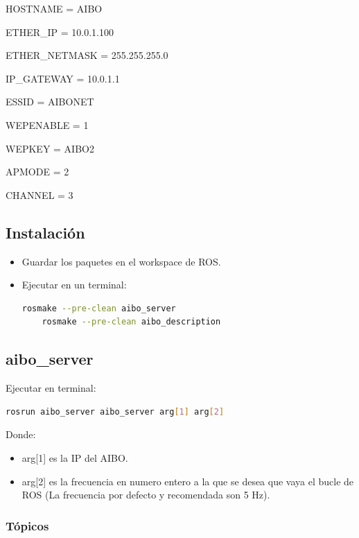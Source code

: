 \documentclass[12pt,a4paper,final,twoside]{book}
\begin{document}
\begin{itemize}
HOSTNAME = AIBO

ETHER{\_}IP = 10.0.1.100

ETHER{\_}NETMASK = 255.255.255.0

IP{\_}GATEWAY = 10.0.1.1

ESSID = AIBONET

WEPENABLE = 1

WEPKEY = AIBO2

APMODE = 2

CHANNEL = 3 
\end{itemize}

\subsection{Instalación}
\begin{itemize}
\item Guardar los paquetes en el workspace de ROS.
\item Ejecutar en un terminal:
\begin{lstlisting}[language=bash]
	rosmake --pre-clean aibo_server
	rosmake --pre-clean aibo_description
\end{lstlisting}


\end{itemize}
\subsection{aibo{\_}server}
Ejecutar en terminal:
\begin{lstlisting}[language=bash]
	rosrun aibo_server aibo_server arg[1] arg[2]
\end{lstlisting}



Donde:
\begin{itemize}
\item arg[1] es la IP del AIBO.
\item arg[2] es la frecuencia en numero entero a la que se desea que vaya el bucle de ROS (La frecuencia por defecto y recomendada son 5 Hz).
\end{itemize}


\subsubsection{Tópicos}
\end{document}
